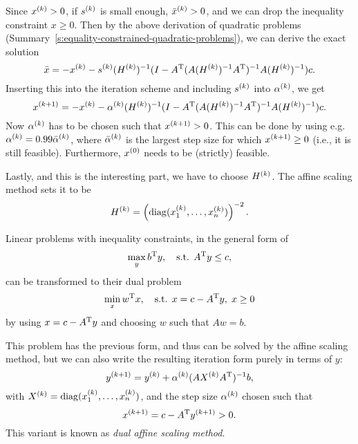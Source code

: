 \documentclass{article}
\begin{document}
Since \(\kth{x} > 0\), if \(\kth{s}\) is small enough, \(\kth{\bar{x}} > 0\), and we can drop the
inequality constraint \(x \geq 0\).  Then by the above derivation of quadratic problems
(Summary~\ref{s:equality-constrained-quadratic-problems}), we can derive the exact solution
\begin{equation*}
  \bar{x} = -\kth{x} - \kth{s}(\kth{H})^{-1}(I - \T{A} (A(\kth{H})^{-1}\T{A})^{-1} A (\kth{H})^{-1})c.
\end{equation*}
Inserting this into the iteration scheme and including \(\kth{s}\) into \(\kth{\alpha}\), we get
\begin{equation*}
  \kth[k+1]{x} = -\kth{x} -
  \kth{\alpha}(\kth{H})^{-1}(I - \T{A} (A(\kth{H})^{-1}\T{A})^{-1} A (\kth{H})^{-1})c.
\end{equation*}
Now \(\kth{\alpha}\) has to be chosen such that \(\kth[k+1]{x} > 0\).  This can be done by using
e.g. \(\kth{\alpha} = 0.99\kth{\bar{\alpha}}\), where \(\kth{\bar{\alpha}}\) is the largest step
size for which \(\kth[k+1]{x} \geq 0\) (i.e., it is still feasible).  Furthermore, \(\kth[0]{x}\)
needs to be (strictly) feasible.

Lastly, and this is the interesting part, we have to choose \(\kth{H}\).  The affine scaling method
sets it to be
\begin{equation*}
  \kth{H} = \left( \diag(\kth{x}_1, \dots, \kth{x}_n) \right)^{-2}.
\end{equation*}


\label{s:inequality-constrained-linear-programming}

Linear problems with inequality constraints, in the general form of
\begin{equation*}
  \max_y \T{b}y, \quad\text{s.t. } \T{A}y \leq c,
\end{equation*}
can be transformed to their dual problem
\begin{equation*}
  \min_x \T{w} x, \quad\text{s.t. } x = c - \T{A}y, \; x \geq 0
\end{equation*}
by using \(x = c - \T{A}y\) and choosing \(w\) such that \(Aw = b\).

This problem has the previous form, and thus can be solved by the affine scaling method, but we can
also write the resulting iteration form purely in terms of \(y\):
\begin{equation*}
  \kth[k+1]{y} = \kth{y} + \kth{\alpha}(A \kth{X} \T{A})^{-1} b,
\end{equation*}
with \(\kth{X} = \diag(\kth{x}_1, \dots, \kth{x}_n)\), and the step size \(\kth{\alpha}\) chosen
such that
\begin{equation*}
  \kth[k+1]{x} = c - \T{A}\kth[k+1]{y} > 0.
\end{equation*}
This variant is known as \emph{dual affine scaling method}.
\end{document}
